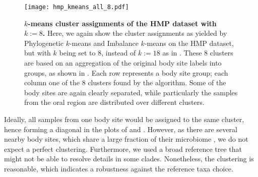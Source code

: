 \begin{figure}[hpbt]
    \centering
    \texttt{[image: hmp\_kmeans\_all\_8.pdf]}
    \begin{subfigure}{0pt}
        \label{fig:hmp_kmeans_all_8:sub:em_unconstr}
    \end{subfigure}
    \begin{subfigure}{0pt}
        \label{fig:hmp_kmeans_all_8:sub:ei_unconstr}
    \end{subfigure}
    \caption[$k$-means cluster assignments of the \acs{HMP} dataset with $k:=8$]{
        \textbf{$k$-means cluster assignments of the \acs{HMP} dataset with $k:=8$.}
        Here, we again show the cluster assignments as yielded by
         Phylogenetic $k$-means and
         Imbalance $k$-means on the \ac{HMP} dataset,
        but with $k$ being set to 8, instead of $k:=18$ as in .
        These \num{8} clusters are based on an aggregation of the original body site labels into groups,
        as shown in .
        Each row represents a body site group; each column one of the \num{8} clusters found by the algorithm.
        Some of the body sites are again clearly separated,
        while particularly the samples from the oral region are distributed over different clusters.
    }
    \label{fig:hmp_kmeans_all_8}
\end{figure}

Ideally, all samples from one body site would be assigned to the same cluster,
hence forming a diagonal in the plots of  and .
However, as there are several nearby body sites, which share a large fraction of their microbiome \cite{Huttenhower2012},
we do not expect a perfect clustering.
Furthermore, we used a broad reference tree that might not be able to resolve details in some clades.
Nonetheless, the clustering is reasonable, which indicates a robustness against the reference taxa choice.

